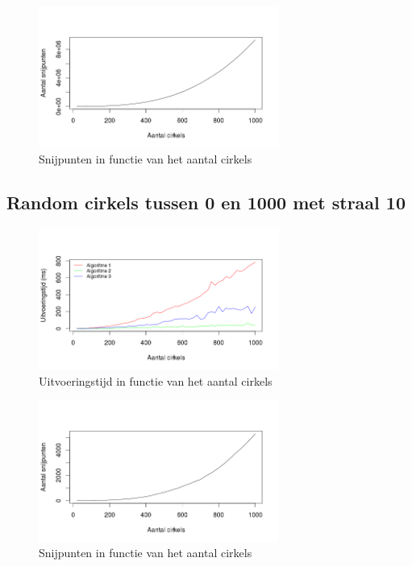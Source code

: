 \documentclass[11pt,a4paper]{article}
\begin{document}
\begin{figure}[H]
\centering
\includegraphics[width=0.7\textwidth]{snijpunten_10.png}
\caption*{Snijpunten in functie van het aantal cirkels}
\end{figure}

\subsection{Random cirkels tussen 0 en 1000 met straal 10}
\begin{figure}[H]
\centering
\includegraphics[width=0.7\textwidth]{uitvoeringstijd_100.png}
\caption*{Uitvoeringstijd in functie van het aantal cirkels}
\end{figure}

\begin{figure}[H]
\centering
\includegraphics[width=0.7\textwidth]{snijpunten_100.png}
\caption*{Snijpunten in functie van het aantal cirkels}
\end{figure}
\end{document}
